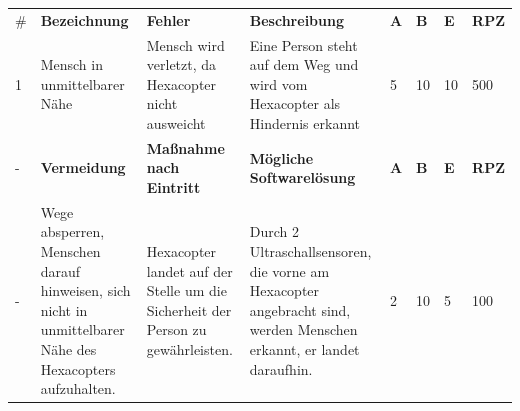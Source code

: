 \begin{longtable}{|p{0.4cm}|p{3.0cm}|p{3.1cm}|p{3.1cm}|p{0.4cm}|p{0.4cm}|p{0.4cm}|p{0.8cm}|}

\hline \#   & \textbf{Bezeichnung}                                                                                               & \textbf{Fehler}                                                                                                                & \textbf{Beschreibung}                                                                                                                    & \textbf{A}   & \textbf{B}   & \textbf{E}   & \textbf{RPZ} \\
 1          & Mensch in unmittelbarer Nähe                                                                              & Mensch wird verletzt, da Hexacopter nicht ausweicht                                                                   & Eine Person steht auf dem Weg und wird vom Hexacopter als Hindernis erkannt                                                     & 5   & 10  & 10  & 500 \\
\hline -    & \textbf{Vermeidung}                                                                                                & \textbf{Maßnahme nach Eintritt}                                                                                                & \textbf{Mögliche Softwarelösung}                                                                                                         & \textbf{A}   & \textbf{B}   & \textbf{E}   & \textbf{RPZ} \\
 -          & Wege absperren, Menschen darauf hinweisen, sich nicht in unmittelbarer Nähe des Hexacopters aufzuhalten.  & Hexacopter landet auf der Stelle um die Sicherheit der Person zu gewährleisten.                                       & Durch 2 Ultraschallsensoren, die vorne am Hexacopter angebracht sind, werden Menschen erkannt, er landet daraufhin.             & 2   & 10  & 5   & 100 \\\hline


\end{longtable}
